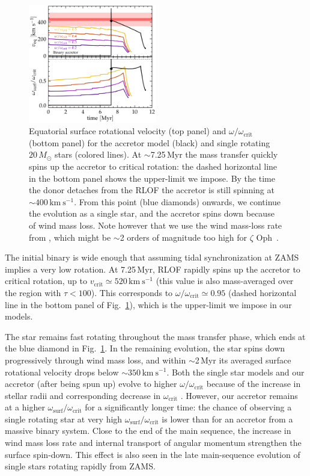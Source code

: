 \documentclass[twocolumn,twocolappendix,trackchanges]{aastex63}
\newcommand{\kms}{{\mathrm{km\ s^{-1}}}}
\DeclareRobustCommand{\Figref}[1]{Fig.~\ref{#1}}
\newcommand{\zoph}{$\zeta$ Oph}
\begin{document}
\begin{figure}[tbp]
  \includegraphics[width=0.5\textwidth]{zeta_rot}
  \caption{Equatorial surface rotational velocity (top panel) and
    $\omega/\omega_\mathrm{crit}$ (bottom panel) for the accretor model (black) and single rotating
    $20\,M_\odot$ stars (colored lines). At
    $\sim$7.25\,Myr the mass transfer quickly spins up the accretor to critical rotation: the dashed horizontal line in the bottom panel shows the upper-limit we impose. By the time the donor detaches from the RLOF the accretor is still spinning at
    $\sim$$400\,\kms$. From this point (blue diamonds) onwards, we
    continue the evolution as a single star, and the accretor spins
    down because of wind mass loss.  Note however that we use the wind
    mass-loss rate from \cite{vink:01}, which might be $\sim$2 orders
    of magnitude too high for \zoph\ \citep{marcolino:09}.}
  \label{fig:surf_rot}
\end{figure}



The initial binary is wide enough that assuming tidal synchronization
at ZAMS implies a very low rotation. At 7.25\,Myr, RLOF rapidly spins
up the accretor to critical rotation, up to
$v_\mathrm{crit}\simeq520\,\kms$ (this value is also mass-averaged
over the region with $\tau<100$). This corresponds to
$\omega/\omega_\mathrm{crit}\simeq 0.95$ (dashed horizontal line in
the bottom panel of \Figref{fig:surf_rot}), which is the upper-limit
we impose in our models.

The star remains fast rotating throughout the mass transfer phase,
which ends at the blue diamond in \Figref{fig:surf_rot}. In the
remaining evolution, the star spins down progressively through wind
mass loss, and within $\sim$2\,Myr its averaged surface rotational
velocity drops below
$\sim$$350\,\kms$. Both the single star models and our accretor (after being spun up) evolve to higher
$\omega/\omega_\mathrm{crit}$ because of the increase in stellar radii and corresponding decrease in
$\omega_\mathrm{crit}$ \citep[e.g.,][]{langer:98, zhao:20}. However, our accretor remains at a higher
$\omega_\mathrm{surf}/\omega_\mathrm{crit}$ for a significantly longer time: the chance of observing a single rotating star at very high
$\omega_\mathrm{surf}/\omega_\mathrm{crit}$ is lower than for an accretor from a massive binary system. Close to the end of the main sequence, the increase in wind mass loss rate and internal transport of angular momentum strengthen the surface spin-down. This effect is also seen in the late main-sequence evolution of single stars rotating rapidly from ZAMS.
\end{document}
